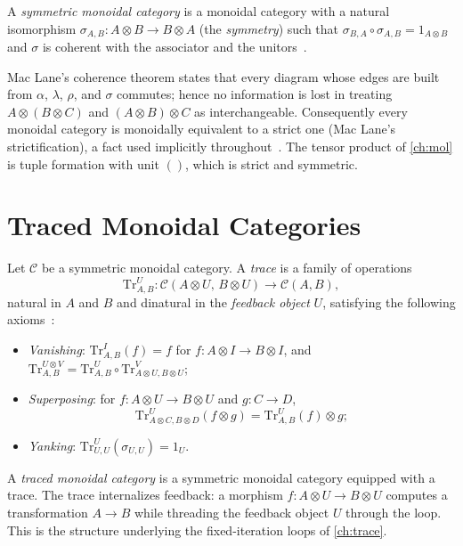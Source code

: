 \begin{definition}
A \emph{symmetric monoidal category} is a monoidal category with a natural
isomorphism $\sigma_{A,B} \colon A \otimes B \to B \otimes A$ (the
\emph{symmetry}) such that $\sigma_{B,A} \circ \sigma_{A,B} = 1_{A \otimes B}$
and $\sigma$ is coherent with the associator and the unitors~\cite{maclane}.
\end{definition}

\begin{remark}[Coherence]
Mac Lane's coherence theorem states that every diagram whose edges are built
from $\alpha$, $\lambda$, $\rho$, and $\sigma$ commutes; hence no information
is lost in treating $A \otimes (B \otimes C)$ and $(A \otimes B) \otimes C$
as interchangeable. Consequently every monoidal category is monoidally
equivalent to a strict one (Mac Lane's strictification), a fact used
implicitly throughout~\cite{maclane}. The tensor product of \autoref{ch:mol}
is tuple formation with unit $()$, which is strict and symmetric.
\end{remark}

\section{Traced Monoidal Categories}\label{sec:prelim-trace}

\begin{definition}
Let $\mathcal{C}$ be a symmetric monoidal category. A \emph{trace} is a
family of operations
\[ \mathrm{Tr}^{U}_{A,B} \colon \mathcal{C} (A \otimes U,\, B \otimes U)
   \to \mathcal{C} (A,B), \]
natural in $A$ and $B$ and dinatural in the \emph{feedback object} $U$,
satisfying the following axioms~\cite{joyalsv, arxiv-traced-monoidal}:
\begin{itemize}
  \item \emph{Vanishing}: $\mathrm{Tr}^{I}_{A,B} (f) = f$ for
        $f \colon A \otimes I \to B \otimes I$, and
        $\mathrm{Tr}^{U \otimes V}_{A,B}
        = \mathrm{Tr}^{U}_{A,B} \circ
          \mathrm{Tr}^{V}_{A \otimes U, B \otimes U}$;
  \item \emph{Superposing}: for $f \colon A \otimes U \to B \otimes U$ and
        $g \colon C \to D$,
        \[ \mathrm{Tr}^{U}_{A \otimes C, B \otimes D} (f \otimes g)
           = \mathrm{Tr}^{U}_{A,B} (f) \otimes g; \]
  \item \emph{Yanking}: $\mathrm{Tr}^{U}_{U,U} (\sigma_{U,U}) = 1_U$.
\end{itemize}
A \emph{traced monoidal category} is a symmetric monoidal category equipped
with a trace. The trace internalizes feedback: a morphism
$f \colon A \otimes U \to B \otimes U$ computes a transformation $A \to B$
while threading the feedback object $U$ through the loop. This is the
structure underlying the fixed-iteration loops of \autoref{ch:trace}.
\end{definition}

